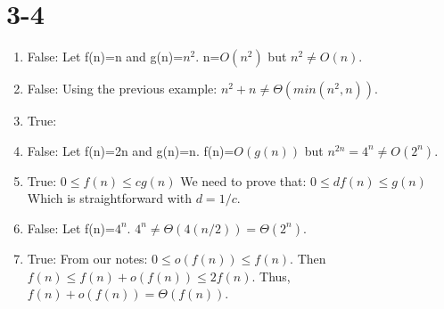 \documentclass[12pt]{article}
\begin{document}
\section{3-4}
\begin{enumerate}[label=\alph*]

\item False: Let f(n)=n and g(n)=$n^2$. n=$O(n^2)$ but $n^2 \neq O(n)$. \newline
\item False: Using the previous example: $n^2+n \neq \Theta(min(n^2,n))$. \newline
\item True: \newline
\item False: Let f(n)=2n and g(n)=n. f(n)=$O(g(n))$ but $n^{2n}=4^n \neq O(2^n)$. \newline
\item True: $ 0 \leq f(n) \leq cg(n) $ We need to prove that: $ 0 \leq df(n) \leq g(n) $ Which is straightforward with $d = 1/c$. \newline
\item False: Let f(n)=$4^n$. $4^n \neq \Theta(4(n/2))=\Theta(2^n)$. \newline
\item True: From our notes: $0 \leq o(f(n)) \leq f(n)$. Then $f(n) \leq f(n)+o(f(n)) \leq 2f(n)$. Thus, $f(n)+o(f(n))=\Theta(f(n))$.

\end{enumerate}
\end{document}
